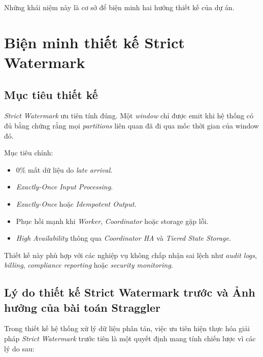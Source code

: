 \documentclass[12pt,a4paper]{article}
\begin{document}
Những khái niệm này là cơ sở để biện minh hai hướng thiết kế của dự án.



\section{Biện minh thiết kế Strict Watermark}

\subsection{Mục tiêu thiết kế}

\textit{Strict Watermark} ưu tiên tính đúng. Một \textit{window} chỉ được emit khi hệ thống có đủ bằng chứng rằng mọi \textit{partitions} liên quan đã đi qua mốc thời gian của window đó.

Mục tiêu chính:

\begin{itemize}
    \item 0\% mất dữ liệu do \textit{late arrival}.
    \item \textit{Exactly-Once Input Processing}.
    \item \textit{Exactly-Once} hoặc \textit{Idempotent Output}.
    \item Phục hồi mạnh khi \textit{Worker}, \textit{Coordinator} hoặc storage gặp lỗi.
    \item \textit{High Availability} thông qua \textit{Coordinator HA} và \textit{Tiered State Storage}.
\end{itemize}

Thiết kế này phù hợp với các nghiệp vụ không chấp nhận sai lệch như \textit{audit logs}, \textit{billing}, \textit{compliance reporting} hoặc \textit{security monitoring}.

\subsection{Lý do thiết kế Strict Watermark trước và Ảnh hưởng của bài toán Straggler}

Trong thiết kế hệ thống xử lý dữ liệu phân tán, việc ưu tiên hiện thực hóa giải pháp \textit{Strict Watermark} trước tiên là một quyết định mang tính chiến lược vì các lý do sau:
\end{document}
